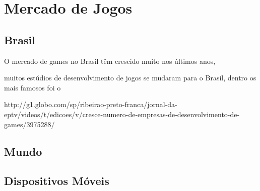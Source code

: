 
\chapter{Mercado de Jogos}
\label{cap:mercadoJogos}


\section{Brasil}

O mercado de games no Brasil têm crescido muito nos últimos anos, 

muitos estúdios de desenvolvimento de jogos se mudaram para o Brasil, dentro os mais famosos foi o 







http://g1.globo.com/sp/ribeirao-preto-franca/jornal-da-eptv/videos/t/edicoes/v/cresce-numero-de-empresas-de-desenvolvimento-de-games/3975288/






\section{Mundo}



\section{Dispositivos Móveis}
